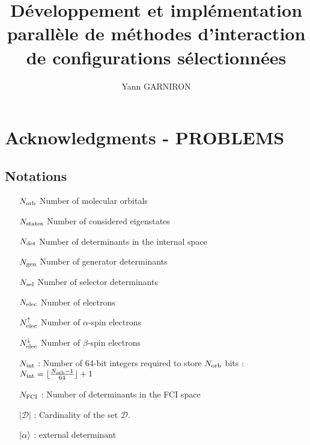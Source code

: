 \documentclass[12pt,a4paper]{report}
\title{Développement et implémentation parallèle de méthodes d'interaction de configurations sélectionnées}
\author{Yann GARNIRON}
\begin{document}
\dominitoc


\newpage

\chapter*{Acknowledgments - PROBLEMS}







\newpage

\tableofcontents
\newpage

\section*{Notations}

\begin{itemize}

\item [${N_\text{orb}}$] Number of molecular orbitals

\item [${N_\text{states}}$] Number of considered eigenstates

\item [${N_\text{det}}$] Number of determinants in the internal space

\item [${N_\text{gen}}$] Number of generator determinants 

\item [${N_\text{sel}}$] Number of selector determinants

\item [${N_\text{elec}}$] Number of electrons

\item [${N_\text{elec}^{\uparrow}}$] Number of $\alpha$-spin electrons

\item [${N_\text{elec}^{\downarrow}}$] Number of $\beta$-spin electrons

\item [${N_\text{int}}$] : Number of 64-bit integers required to store ${N_\text{orb}}$ bits : 
${{N_\text{int}} = \lfloor \frac{{N_\text{orb}}-1}{64} \rfloor + 1}$

%

\item [$N_\text{FCI}$] : Number of determinants in the FCI space

\item [$|\mathcal{D}|$] : Cardinality of the set $\mathcal{D}$.

\item [${\ket{\alpha}}$] : external determinant
\end{itemize}
\end{document}
